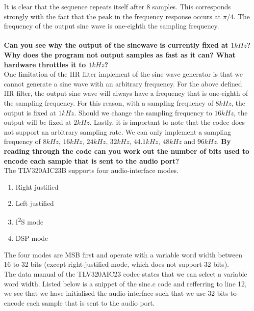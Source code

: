 \documentclass{article}
\begin{document}
It is clear that the sequence repeats itself after 8 samples. This corresponds strongly with the fact that the peak in the frequency response occurs at $\pi/4$. The frequency of the output sine wave is one-eighth the sampling frequency.\\\\
\textbf{Can you see why the output of the sinewave is currently fixed at $1 kHz$? Why does the program not output samples as fast as it can? What hardware throttles it to $1kHz$?}\\

One limitation of the IIR filter implement of the sine wave generator is that we cannot generate a sine wave with an arbitrary frequency. For the above defined IIR filter, the output sine wave will always have a frequency that is one-eighth of the sampling frequency. For this reason, with a sampling frequency of $8kHz$, the output is fixed at $1kHz$. Should we change the sampling frequency to $16kHz$, the output will be fixed at $2kHz$. Lastly, it is important to note that the codec does not support an arbitrary sampling rate. We can only implement a sampling frequency of $8kHz$, $16kHz$, $24kHz$, $32kHz$, $44.1kHz$, $48kHz$ and $96kHz$.
\newpage
\textbf{By reading through the code can you work out the number of bits used to encode each sample that is sent to the audio port?}\\


The TLV320AIC23B supports four audio-interface modes.
\begin{enumerate}
    \item Right justified
    \item Left justified
    \item I\textsuperscript{2}S mode
    \item DSP mode
\end{enumerate}
The four modes are MSB first and operate with a variable word width between 16 to 32 bits (except right-justified mode, which does not support 32 bits)\cite{audio-interface}.\\


The data manual of the TLV320AIC23 codec states that we can select a variable word width. Listed below is a snippet of the sinc.c code and refferring to line 12, we see that we have initialised the audio interface such that we use 32 bits to encode each sample that is sent to the audio port. \\
\end{document}
